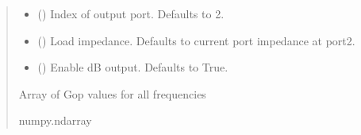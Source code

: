 \documentclass[letterpaper,10pt,english]{sphinxmanual}
\begin{document}
\begin{fulllineitems}
\begin{fulllineitems}
\begin{quote}
\begin{description}
\begin{itemize}
\item {}
\sphinxAtStartPar
{} (\sphinxstyleliteralemphasis{\sphinxupquote{, }}) \textendash{} Index of output port. Defaults to 2.

\item {}
\sphinxAtStartPar
{} (\sphinxstyleliteralemphasis{\sphinxupquote{, }}) \textendash{} Load impedance. Defaults to current port impedance at port2.

\item {}
\sphinxAtStartPar
{} (\sphinxstyleliteralemphasis{\sphinxupquote{, }}) \textendash{} Enable dB output. Defaults to True.

\end{itemize}

\sphinxAtStartPar
Array of Gop values for all frequencies

\sphinxAtStartPar
numpy.ndarray

\end{description}\end{quote}

\end{fulllineitems}



\end{fulllineitems}
\end{document}
